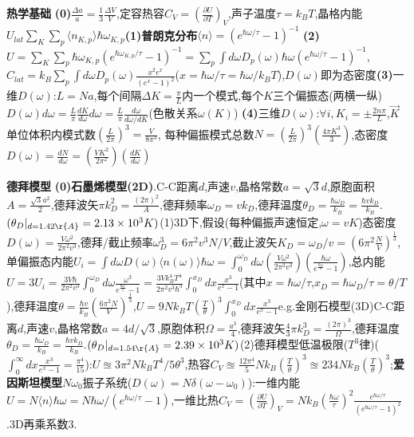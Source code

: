 \documentclass[UTF8,a4paper,10pt,twocolumn]{ctexart}
\begin{document}
  \textbf{热学基础}
  \textbf{(0)}$\frac{\Delta a}{a}=\frac{1}{3}\frac{\Delta V}{V}$,定容热容$C_V=(\frac{\partial U}{\partial T})_V$,声子温度$\tau=k_{B}T$,晶格内能$U_{lat}\sum_{K}\sum_{p}\langle n_{K,p}\rangle\hbar\omega_{K,p}$\textbf{(1)普朗克分布}$\langle n\rangle=(e^{\hbar\omega/\tau}-1)^{-1}$
  \textbf{(2)}$U=\sum_{K}\sum_{p}\hbar\omega_{K,p}(e^{\hbar\omega_{K,p}/\tau}-1)^{-1}=\sum_{p}\int d\omega D_{p}(\omega)\hbar\omega (e^{\hbar\omega/\tau}-1)^{-1}$,
  $C_{lat}=k_{B}\sum_{p}\int d\omega D_{p}(\omega)\frac{x^2 e^x}{(e^x -1)^2}$($x=\hbar\omega/\tau=\hbar\omega/k_{B}T$),$D(\omega)$即为态密度\textbf{(3)}一维$D(\omega)$:$L=Na$,每个间隔$\Delta K=\frac{\pi}{L}$内一个模式,每个$K$三个偏振态(两横一纵)$D(\omega)d\omega=\frac{L}{\pi}\frac{dK}{d\omega}d\omega=\frac{L}{\pi}\frac{d\omega}{d\omega/dK}$(色散关系$\omega(K)$)
  \textbf{(4)}三维$D(\omega)$:$\forall i, K_{i}=\pm\frac{2n\pi}{L}$,$\vec{K}$单位体积内模式数$(\frac{L}{2\pi})^3=\frac{V}{8\pi^3}$,
  每种偏振模式总数$N=(\frac{L}{2\pi})^3(\frac{4\pi K^3}{3})$,态密度$D(\omega)=\frac{dN}{d\omega}=(\frac{VK^2}{2\pi^2})(\frac{dK}{d\omega})$
  
  \textbf{德拜模型}
  \textbf{(0)石墨烯模型(2D)}.C-C距离$d$,声速$v$,晶格常数$a=\sqrt{3}d$,原胞面积$A=\frac{\sqrt{3}a^2}{2}$,德拜波矢$\pi k_D^2=\frac{(2\pi)^2}{A}$,德拜频率$\omega_D=vk_D$,德拜温度$\theta_D=\frac{\hbar\omega_D}{k_B}=\frac{\hbar v k_D}{k_B}$.$(\theta_D|_{d=1.42\r{A}}=2.13\times10^3K)$(1)3D下,假设(每种偏振声速恒定,$\omega=vK$)态密度$D(\omega)=\frac{V\omega^2}{2\pi^{2}v^3}$,德拜/截止频率$\omega_{D}^3=6\pi^{2}v^{3}N/V$,截止波矢$K_{D}=\omega_{D}/v=(6\pi^{2}\frac{N}{V})^{\frac{1}{3}}$,单偏振态内能$U_i=\int d\omega D(\omega)\langle n(\omega)\rangle\hbar\omega=\int_{0}^{\omega_{D}}d\omega(\frac{V\omega^{2}}{2\pi^{2}v^{3}})(\frac{\hbar\omega}{e^{\frac{\hbar\omega}{\tau}}-1})$,总内能$U=3U_i=\frac{3V\hbar}{2\pi^2 v^3}\int_{0}^{\omega_{D}}d\omega\frac{\omega^3}{e^{\frac{\hbar\omega}{\tau}}-1}=\frac{3Vk_{B}^{4}T^{4}}{2\pi^2 v^3 \hbar^3}\int_{0}^{x_{D}}dx\frac{x^3}{e^x - 1}$(其中$x=\hbar\omega/\tau$,$x_{D}=\hbar\omega_{D}/\tau=\theta/T$),德拜温度$\theta=\frac{\hbar v}{k_{B}}(\frac{6\pi^2N}{V})^{\frac{1}{3}}$,$U=9Nk_{B}T(\frac{T}{\theta})^3\int_{0}^{x_D}dx\frac{x^3}{e^x -1}$e.g.金刚石模型(3D)C-C距离$d$,声速$v$,晶格常数$a=4d/\sqrt{3}$,原胞体积$\Omega=\frac{a^3}{4}$,德拜波矢$\frac{4}{3}\pi k_D^3=\frac{(2\pi)^3}{\Omega}$,德拜温度$\theta_D=\frac{\hbar\omega_D}{k_B}=\frac{\hbar v k_D}{k_B}$.$(\theta_D|_{d=1.54\r{A}}=2.39\times10^3K)$(2)德拜模型低温极限($T^3$律)($\int_{0}^{\infty}dx\frac{x^3}{e^x -1}=\frac{\pi^4}{15}$):$U\approxeq3\pi^2 Nk_{B}T^4/5\theta^3$,热容$C_{V}\approxeq\frac{12\pi^4}{5}Nk_{B}(\frac{T}{\theta})^3\approxeq 234Nk_{B}(\frac{T}{\theta})^3$;\textbf{爱因斯坦模型}$N\omega_0$振子系统($D(\omega)=N\delta(\omega-\omega_{0})$):一维内能$U=N\langle n\rangle\hbar\omega=N\hbar\omega/(e^{\hbar\omega/\tau}-1)$,一维比热$C_{V}=(\frac{\partial U}{\partial T})_{V}=Nk_{B}(\frac{\hbar\omega}{\tau})^2\frac{e^{\hbar\omega/\tau}}{(e^{\hbar\omega/\tau}-1)^2}$.3D再乘系数3.
   
\end{document}
